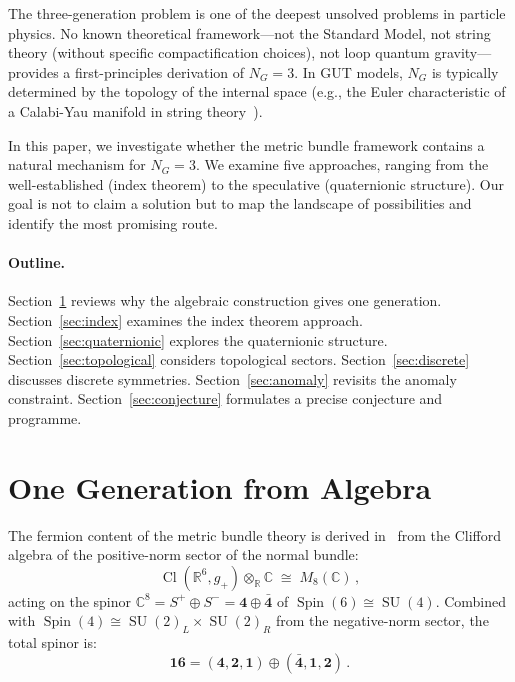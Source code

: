 \documentclass[12pt,a4paper]{article}
\theoremstyle{definition}
\newcommand{\SU}{\operatorname{SU}}
\newcommand{\Spin}{\operatorname{Spin}}
\newcommand{\Cl}{\operatorname{Cl}}
\newcommand{\R}{\mathbb{R}}
\newcommand{\C}{\mathbb{C}}
\begin{document}
The three-generation problem is one of the deepest unsolved problems in particle physics.
No known theoretical framework---not the Standard Model, not string theory (without specific compactification choices), not loop quantum gravity---provides a first-principles derivation of $N_G = 3$.
In GUT models, $N_G$ is typically determined by the topology of the internal space (e.g., the Euler characteristic of a Calabi-Yau manifold in string theory~\cite{CHSW1985}).

In this paper, we investigate whether the metric bundle framework contains a natural mechanism for $N_G = 3$.
We examine five approaches, ranging from the well-established (index theorem) to the speculative (quaternionic structure).
Our goal is not to claim a solution but to map the landscape of possibilities and identify the most promising route.

\paragraph{Outline.}
Section~\ref{sec:algebraic} reviews why the algebraic construction gives one generation.
Section~\ref{sec:index} examines the index theorem approach.
Section~\ref{sec:quaternionic} explores the quaternionic structure.
Section~\ref{sec:topological} considers topological sectors.
Section~\ref{sec:discrete} discusses discrete symmetries.
Section~\ref{sec:anomaly} revisits the anomaly constraint.
Section~\ref{sec:conjecture} formulates a precise conjecture and programme.


\section{One Generation from Algebra}
\label{sec:algebraic}

The fermion content of the metric bundle theory is derived in~\cite{Paper2} from the Clifford algebra of the positive-norm sector of the normal bundle:
\begin{equation}
\Cl(\R^6, g_+) \otimes_\R \C \;\cong\; M_8(\C)\,,
\end{equation}
acting on the spinor $\C^8 = S^+ \oplus S^- = \mathbf{4} \oplus \bar{\mathbf{4}}$ of $\Spin(6) \cong \SU(4)$.
Combined with $\Spin(4) \cong \SU(2)_L \times \SU(2)_R$ from the negative-norm sector, the total spinor is:
\begin{equation}
\mathbf{16} = (\mathbf{4}, \mathbf{2}, \mathbf{1}) \oplus (\bar{\mathbf{4}}, \mathbf{1}, \mathbf{2})\,.
\end{equation}
\end{document}
